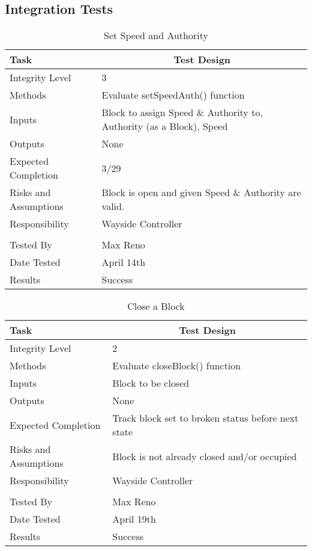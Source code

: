 \documentclass[]{article}
\begin{document}
\subsection{Integration Tests}
	\begin{table}[H]
		\centering
		\caption{Set Speed and Authority}
		\begin{tabular}{|l|l|}
			\hline
			Task & \multicolumn{1}{c|}{Test Design} \\ \hline
			Integrity Level & 3 \\ \hline
			Methods & Evaluate setSpeedAuth() function\\ \hline
			Inputs &  \parbox[t]{10cm}{Block to assign Speed \& Authority to, Authority (as a Block), Speed} \\ \hline
			Outputs & None\\ \hline
			Expected Completion & 3/29 \\ \hline
			Risks and Assumptions & \parbox[t]{10cm}{Block is open and given Speed \& Authority are valid.} \\ \hline
			Responsibility & Wayside Controller\\ \hline
			\\ \hline
			Tested By   &  Max Reno\\	\hline
			Date Tested & \parbox[t]{10cm}{April 14th}\\ \hline
			Results & Success \\ \hline
		\end{tabular}
	\end{table}
	
	\begin{table}[H]
		\centering
		\caption{Close a Block}
		\begin{tabular}{|l|l|}
			\hline
			Task & \multicolumn{1}{c|}{Test Design} \\ \hline
			Integrity Level & 2 \\ \hline
			Methods & Evaluate closeBlock() function\\ \hline
			Inputs &  Block to be closed\\ \hline
			Outputs & None\\ \hline
			Expected Completion & Track block set to broken status before next state \\ \hline
			Risks and Assumptions & \parbox[t]{10cm}{Block is not already closed and/or occupied} \\ \hline
			Responsibility & Wayside Controller\\ \hline
			\\ \hline
			Tested By   &  Max Reno\\	\hline
			Date Tested & \parbox[t]{10cm}{April 19th}\\ \hline
			Results & Success\\ \hline
		\end{tabular}
	\end{table}
	
\end{document}
